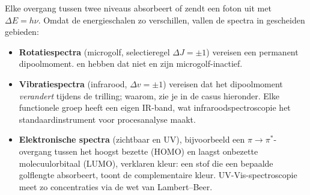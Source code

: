 Elke overgang tussen twee niveaus absorbeert of zendt een foton uit met $\Delta E = h\nu$. Omdat de energieschalen zo verschillen, vallen de spectra in gescheiden gebieden:
\begin{itemize}
\item \textbf{Rotatiespectra} (microgolf, selectieregel $\Delta J=\pm1$) vereisen een permanent dipoolmoment.  en  hebben dat niet en zijn microgolf-inactief.
\item \textbf{Vibratiespectra} (infrarood, $\Delta v=\pm1$) vereisen dat het dipoolmoment \emph{verandert} tijdens de trilling; waarom, zie je in de casus hieronder. Elke functionele groep heeft een eigen IR-band, wat infraroodspectroscopie het standaardinstrument voor procesanalyse maakt.
\item \textbf{Elektronische spectra} (zichtbaar en UV), bijvoorbeeld een $\pi\to\pi^*$-overgang tussen het hoogst bezette (HOMO) en laagst onbezette molecuulorbitaal (LUMO), verklaren kleur: een stof die een bepaalde golflengte absorbeert, toont de complementaire kleur. UV-Vis-spectroscopie meet zo concentraties via de wet van Lambert--Beer.
\end{itemize}

